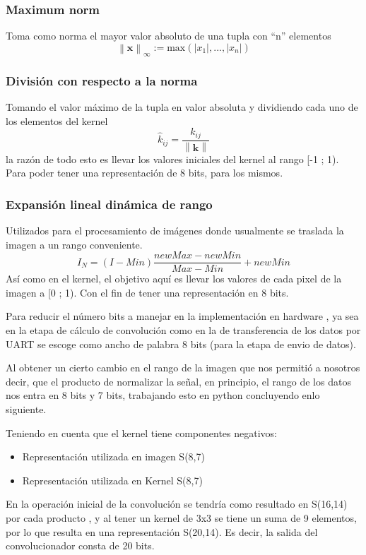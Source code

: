 \documentclass[conference,compsoc]{IEEEtran}
\begin{document}
\subsubsection{Maximum norm}
Toma como norma el mayor valor absoluto de una tupla con “n” elementos
$$
\left \|\mathbf{x}  \right \|_\infty:= \textrm{max}(\left | x_1 \right |,...,\left | x_n \right |)
$$

\subsubsection{Divisi\'on con respecto a la norma}
Tomando el valor m\'aximo de la tupla en valor absoluta y dividiendo cada uno de
los elementos del kernel
$$
\hat{k}_{ij}=\frac{k_{ij}}{\left \| \mathbf{k} \right \|}
$$
la raz\'on de todo esto es llevar los valores iniciales del kernel al rango [-1 ;
1). Para poder tener una representación de 8 bits, para los mismos.

\subsubsection{Expansi\'on lineal din\'amica de rango}
Utilizados para el procesamiento de im\'agenes donde usualmente se traslada la
imagen a un rango conveniente.
$$
I_N=(I-Min)\frac{newMax-newMin}{Max-Min}+newMin
$$
As\'i como en el kernel, el objetivo aqu\'i es llevar los valores de cada pixel de
la imagen a [0 ; 1). Con el fin de tener una representaci\'on en 8 bits.

Para reducir el n\'umero bits a manejar en la implementaci\'on en hardware , ya sea
en la etapa de c\'alculo de convoluci\'on como en la de transferencia de los datos
por UART se escoge como ancho de palabra 8 bits (para la etapa de envio de
datos).

Al obtener un cierto cambio en el rango de la imagen que nos permiti\'o a nosotros
decir, que el producto de normalizar la señal, en principio, el rango de los
datos nos entra en 8 bits y 7 bits, trabajando esto en python concluyendo enlo
siguiente.


Teniendo en cuenta que el kernel tiene componentes negativos:

\begin{itemize}
  \item Representaci\'on utilizada en imagen     S(8,7)
  \item Representaci\'on utilizada en Kernel    S(8,7)
\end{itemize}

En la operaci\'on inicial de la convoluci\'on se tendr\'ia como resultado en S(16,14)
por cada producto , y al tener un kernel de 3x3 se tiene un suma de 9 elementos, 
por lo que resulta en una representaci\'on S(20,14). Es decir, la salida del convolucionador
consta de 20 bits.
\end{document}
